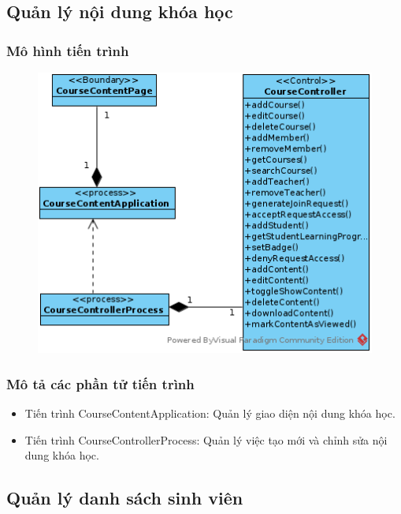 \documentclass[./../main_file.tex]{subfiles}
\begin{document}
\subsection{Quản lý nội dung khóa học}

\subsubsection{Mô hình tiến trình}

\begin{figure}[H]
	\centering
	\includegraphics[width=\linewidth]{./images/pv_manage_contentcourse.png}
\end{figure}

\subsubsection{Mô tả các phần tử tiến trình}
\begin{itemize}
	\item Tiến trình CourseContentApplication: Quản lý giao diện nội dung khóa học.
	\item Tiến trình CourseControllerProcess: Quản lý việc tạo mới và chỉnh sửa nội dung khóa học.
\end{itemize}

\subsection{Quản lý danh sách sinh viên}
\end{document}
